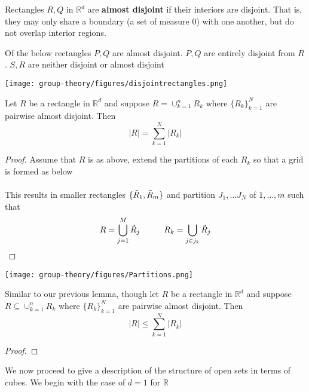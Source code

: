 \begin{definition}
    Rectangles $R, Q$ in $\mathbb{R}^d$ are \textbf{almost disjoint} if their interiors are disjoint. That is, they may only share a boundary (a set of measure 0) with one another, but do not overlap interior regions. 
\end{definition}

\begin{eg}
    Of the below rectangles $P, Q$ are almost disjoint. $P, Q$ are entirely disjoint from $R$. $S,R$ are neither disjoint or almost disjoint
\end{eg}
    \begin{center}
        \texttt{[image: group-theory/figures/disjointrectangles.png]}
    \end{center}

\begin{lemma}
    Let $R$ be a rectangle in $\mathbb{R}^d$ and suppose $R = \cup_{k=1}^{n}R_k$ where $\{R_k\}_{k=1}^{N}$ are pairwise almost disjoint. Then
    $$|R| = \sum_{k=1}^{N}|R_k|$$
\end{lemma}

\begin{proof}
    Assume that $R$ is as above, extend the partitions of each $R_k$ so that a grid is formed as below \\
    \\
    This results in smaller rectangles $\{\Tilde{R}_1, \Tilde{R}_m\}$ and partition $J_1, \dots J_N$ of $1, \dots, m$ such that 
    $$R = \bigcup_{j=1}^{M}\Tilde{R}_j \hspace{10mm} R_k = \bigcup_{j\in j_k}\Tilde{R}_j$$
\end{proof}
    \begin{center}
        \texttt{[image: group-theory/figures/Partitions.png]}
    \end{center}


\begin{lemma}
    Similar to our previous lemma, though let $R$ be a rectangle in $\mathbb{R}^d$ and suppose $R \subseteq \cup_{k=1}^{n}R_k$ where $\{R_k\}_{k=1}^{N}$ are pairwise almost disjoint. Then
    $$|R| \leq \sum_{k=1}^{N}|R_k|$$
\end{lemma}
\begin{proof}
    
\end{proof}

We now proceed to give a description of the structure of open sets in
terms of cubes. We begin with the case of $d=1$ for $\mathbb{R}$

